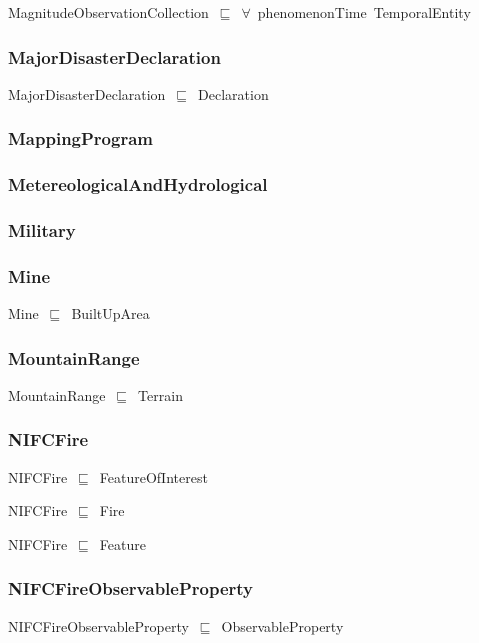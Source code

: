 \documentclass{article}
\begin{document}
MagnitudeObservationCollection~\ensuremath{\sqsubseteq}~\ensuremath{\forall}~phenomenonTime~TemporalEntity~

\subsubsection*{MajorDisasterDeclaration}

MajorDisasterDeclaration~\ensuremath{\sqsubseteq}~Declaration~

\subsubsection*{MappingProgram}

\subsubsection*{MetereologicalAndHydrological}

\subsubsection*{Military}

\subsubsection*{Mine}

Mine~\ensuremath{\sqsubseteq}~BuiltUpArea~

\subsubsection*{MountainRange}

MountainRange~\ensuremath{\sqsubseteq}~Terrain~

\subsubsection*{NIFCFire}

NIFCFire~\ensuremath{\sqsubseteq}~FeatureOfInterest~

NIFCFire~\ensuremath{\sqsubseteq}~Fire~

NIFCFire~\ensuremath{\sqsubseteq}~Feature~

\subsubsection*{NIFCFireObservableProperty}

NIFCFireObservableProperty~\ensuremath{\sqsubseteq}~ObservableProperty~
\end{document}
